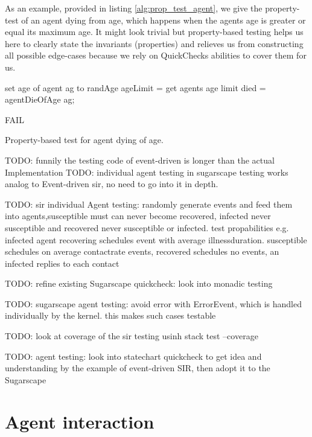 As an example, provided in listing \ref{alg:prop_test_agent}, we give the property-test of an agent dying from age, which happens when the agents age is greater or equal its maximum age. It might look trivial but property-based testing helps us here to clearly state the invariants (properties) and relieves us from constructing all possible edge-cases because we rely on QuickChecks abilities to cover them for us.

\begin{algorithm}
set age of agent ag to randAge\;
ageLimit = get agents age limit\; 
died = agentDieOfAge ag;\

 {
  FAIL\;
}
\caption{Property-based test for agent dying of age.}
\end{algorithm}
\label{alg:prop_test_agent}

TODO: funnily the testing code of event-driven is longer than the actual Implementation
TODO: individual agent testing in sugarscape testing works analog to Event-driven sir, no need to go into it in depth.

TODO: sir individual Agent testing: randomly generate events and feed them into agents,susceptible must can never become recovered, infected never susceptible and recovered never susceptible or infected. test propabilities e.g. infected agent recovering schedules event with average illnessduration. susceptible schedules on average contactrate events, recovered schedules no events, an infected replies to each contact

TODO: refine existing Sugarscape quickcheck: look into monadic testing

TODO: sugarscape agent testing: avoid error with ErrorEvent, which is handled individually by the kernel. this makes such cases testable

TODO: look at coverage of the sir testing usinh stack test --coverage

TODO: agent testing: look into statechart quickcheck to get idea and understanding by the example of event-driven SIR, then adopt it to the Sugarscape

\section{Agent interaction}


